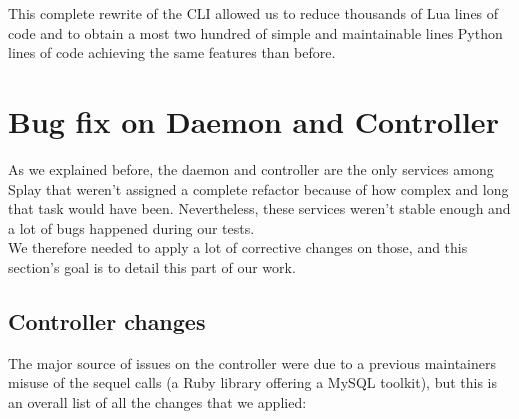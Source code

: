 \documentclass{eplmastersthesis}
\begin{document}
        This complete rewrite of the CLI allowed us to reduce thousands of
        Lua lines of code and to obtain a most two hundred of simple and
        maintainable lines Python lines of code achieving the same features
        than before.

    \section{Bug fix on Daemon and Controller}

      As we explained before, the daemon and controller are the only services
      among Splay that weren't assigned a complete refactor because of how
      complex and long that task would have been. Nevertheless, these services
      weren't stable enough and a lot of bugs happened during our tests.\\
      We therefore needed to apply a lot of corrective changes on those, and
      this section's goal is to detail this part of our work.

      \subsection{Controller changes}

        The major source of issues on the controller were due to a previous
        maintainers misuse of the sequel calls (a Ruby library offering a MySQL
        toolkit), but this is an overall list of all the changes that we
        applied:
\end{document}
